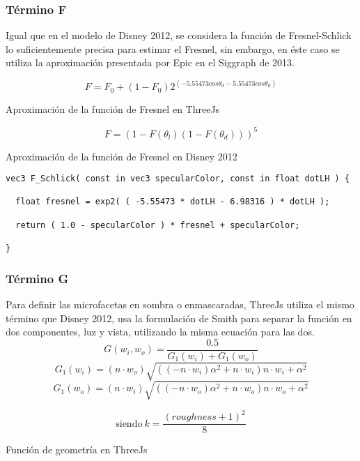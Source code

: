     \subsubsection{T\'ermino F}
    Igual que en el modelo de Disney 2012, se considera la funci\'on de Fresnel-Schlick lo suficientemente precisa para
    estimar el Fresnel, sin embargo, en \'este caso se utiliza la aproximaci\'on presentada por Epic en el Siggraph de 2013.\\

    \begin{eqfloat}
      \begin{equation}
        F= F_0 + (1 - F_0)2^{(-5.55473cos\theta_d - 5.55473cos\theta_d)}
      \end{equation}
    \caption{Aproximaci\'on de la funci\'on de Fresnel en ThreeJs}
    \end{eqfloat}

    \begin{eqfloat}[!htb]
      \begin{equation}
        F= (1 - F(\theta_l) (1 - F(\theta_d)))^5
      \end{equation}
    \caption{Aproximaci\'on de la funci\'on de Fresnel en Disney 2012}
    \end{eqfloat}

    \newpage
    \begin{lstlisting}[caption=Implementaci\'on en ThreeJs de la aproximaci\'on a la funci\'on de Fresnel]
vec3 F_Schlick( const in vec3 specularColor, const in float dotLH ) {

  float fresnel = exp2( ( -5.55473 * dotLH - 6.98316 ) * dotLH );

  return ( 1.0 - specularColor ) * fresnel + specularColor;

}
    \end{lstlisting}
    \singlespacing

    \subsubsection{T\'ermino G}
    Para definir las microfacetas en sombra o enmascaradas, ThreeJs utiliza el mismo t\'ermino que Disney 2012, usa
    la formulaci\'on de Smith para separar la funci\'on en dos componentes, luz y vista, utilizando la misma ecuaci\'on
    para las dos.\\

    $$
    G(w_i, w_o) = \frac{0.5}{G_1(w_i) + G_1(w_o)}
    $$
    \singlespacing
    $$
    G_1(w_i) = (n \cdot{w_o}) \sqrt{((-n\cdot{w_i}) \alpha^2 + n\cdot{w_i}) n\cdot{w_i} + \alpha^2}
    $$
    \singlespacing
    $$
    G_1(w_o) = (n \cdot{w_i}) \sqrt{((-n\cdot{w_o}) \alpha^2 + n\cdot{w_o}) n\cdot{w_o} + \alpha^2}
    $$
    \begin{eqfloat}[!htb]
      \begin{equation}
        \textrm{siendo}\ k = \frac{(roughness + 1)^2}{8}
      \end{equation}
    \caption{Funci\'on de geometr\'ia en ThreeJs}
    \end{eqfloat}
    \singlespacing

